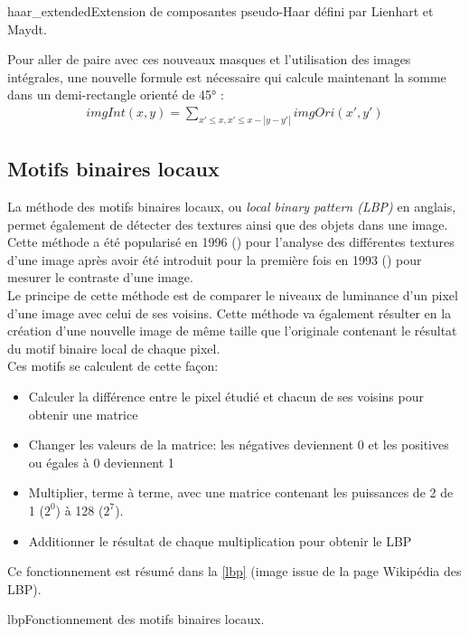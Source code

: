 \documentclass[overfullbox, poster]{polytech/polytech}
\begin{document}
\begin{Figure}{haar_extended}{Extension de composantes pseudo-Haar défini par Lienhart et Maydt}.
\end{Figure}

Pour aller de paire avec ces nouveaux masques et l'utilisation des images intégrales, une nouvelle formule est nécessaire qui calcule maintenant la somme dans un demi-rectangle orienté de 45° :
\begin{align*}
imgInt(x,y)= \sum \nolimits_{x' \leq x , x' \leq x - |y-y'|} imgOri(x',y')
\end{align*}


\subsection{Motifs binaires locaux}
La méthode des motifs binaires locaux, ou \textit{local binary pattern (LBP)} en anglais, permet également de détecter des textures ainsi que des objets dans une image.\\
Cette méthode a été popularisé en 1996 (\cite{lbp}) pour l'analyse des différentes textures d'une image après avoir été introduit pour la première fois en 1993 (\cite{lbp_origin}) pour mesurer le contraste d'une image.\\ 
Le principe de cette méthode est de comparer le niveaux de luminance d'un pixel d'une image avec celui de ses voisins. Cette méthode va également résulter en la création d'une nouvelle image de même taille que l'originale contenant le résultat du motif binaire local de chaque pixel.\\
Ces motifs se calculent de cette façon:
\begin{itemize}
\item Calculer la différence entre le pixel étudié et chacun de ses voisins pour obtenir une matrice
\item Changer les valeurs de la matrice: les négatives deviennent 0 et les positives ou égales à 0 deviennent 1
\item Multiplier, terme à terme, avec une matrice contenant les puissances de 2 de 1 ($2^0$) à 128 ($2^7$).
\item Additionner le résultat de chaque multiplication pour obtenir le LBP\\
\end{itemize}
Ce fonctionnement est résumé dans la \autoref{lbp} (image issue de la page Wikipédia des LBP).
\begin{Figure}{lbp}{Fonctionnement des motifs binaires locaux}.
\end{Figure}
\end{document}
